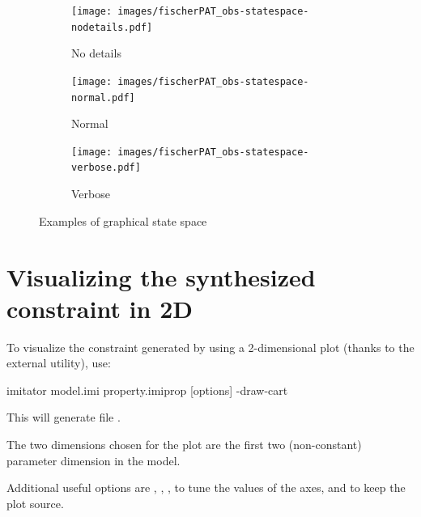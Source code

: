 \begin{figure}
	\centering
	\begin{subfigure}[b]{.48\textwidth}
		\texttt{[image: images/fischerPAT\_obs-statespace-nodetails.pdf]}

		\caption{No details}
		\label{figure:statespace:nodetail}
	\end{subfigure}
	\begin{subfigure}[b]{.48\textwidth}
		\texttt{[image: images/fischerPAT\_obs-statespace-normal.pdf]}

		\caption{Normal}
		\label{figure:statespace:normal}
	\end{subfigure}

	\begin{subfigure}[b]{.75\textwidth}
		\texttt{[image: images/fischerPAT\_obs-statespace-verbose.pdf]}

		\caption{Verbose}
		\label{figure:statespace:verbose}
	\end{subfigure}

	\caption{Examples of graphical state space}
\end{figure}



\section{Visualizing the synthesized constraint in 2D}

To visualize the constraint generated by \imitator{} using a 2-dimensional plot (thanks to the external  utility), use:

\begin{terminal}
imitator model.imi property.imiprop [options] -draw-cart
\end{terminal}

This will generate file .

The two dimensions chosen for the plot are the first two (non-constant) parameter dimension in the model.

Additional useful options are
,
,
,
to tune the values of the axes,
and  to keep the plot source.


